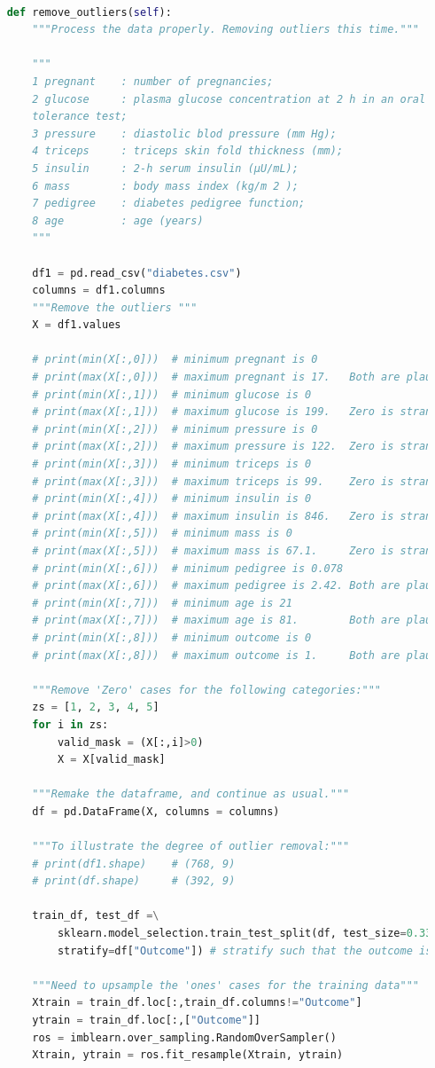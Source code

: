\documentclass[]{article}
\begin{document}
\begin{lstlisting}[language=Python]
	
	def remove_outliers(self):
		"""Process the data properly. Removing outliers this time."""
		
		"""
		1 pregnant    : number of pregnancies;
		2 glucose     : plasma glucose concentration at 2 h in an oral glucose
		tolerance test;
		3 pressure    : diastolic blod pressure (mm Hg);
		4 triceps     : triceps skin fold thickness (mm);
		5 insulin     : 2-h serum insulin (μU/mL);
		6 mass        : body mass index (kg/m 2 );
		7 pedigree    : diabetes pedigree function;
		8 age         : age (years)
		"""
		
		df1 = pd.read_csv("diabetes.csv")
		columns = df1.columns
		"""Remove the outliers """
		X = df1.values
		
		# print(min(X[:,0]))  # minimum pregnant is 0
		# print(max(X[:,0]))  # maximum pregnant is 17.   Both are plausable
		# print(min(X[:,1]))  # minimum glucose is 0
		# print(max(X[:,1]))  # maximum glucose is 199.   Zero is strange.
		# print(min(X[:,2]))  # minimum pressure is 0
		# print(max(X[:,2]))  # maximum pressure is 122.  Zero is strange.
		# print(min(X[:,3]))  # minimum triceps is 0
		# print(max(X[:,3]))  # maximum triceps is 99.    Zero is strange.
		# print(min(X[:,4]))  # minimum insulin is 0
		# print(max(X[:,4]))  # maximum insulin is 846.   Zero is strange.
		# print(min(X[:,5]))  # minimum mass is 0
		# print(max(X[:,5]))  # maximum mass is 67.1.     Zero is strange.
		# print(min(X[:,6]))  # minimum pedigree is 0.078
		# print(max(X[:,6]))  # maximum pedigree is 2.42. Both are plausable
		# print(min(X[:,7]))  # minimum age is 21
		# print(max(X[:,7]))  # maximum age is 81.        Both are plausable
		# print(min(X[:,8]))  # minimum outcome is 0
		# print(max(X[:,8]))  # maximum outcome is 1.     Both are plausable
		
		"""Remove 'Zero' cases for the following categories:"""
		zs = [1, 2, 3, 4, 5]
		for i in zs:
			valid_mask = (X[:,i]>0)
			X = X[valid_mask]
		
		"""Remake the dataframe, and continue as usual."""
		df = pd.DataFrame(X, columns = columns)
		
		"""To illustrate the degree of outlier removal:"""
		# print(df1.shape)    # (768, 9)
		# print(df.shape)     # (392, 9)
		
		train_df, test_df =\
			sklearn.model_selection.train_test_split(df, test_size=0.33,\
			stratify=df["Outcome"]) # stratify such that the outcome is even
		
		"""Need to upsample the 'ones' cases for the training data"""
		Xtrain = train_df.loc[:,train_df.columns!="Outcome"]
		ytrain = train_df.loc[:,["Outcome"]]
		ros = imblearn.over_sampling.RandomOverSampler()
		Xtrain, ytrain = ros.fit_resample(Xtrain, ytrain)
		

\end{lstlisting}
\end{document}
